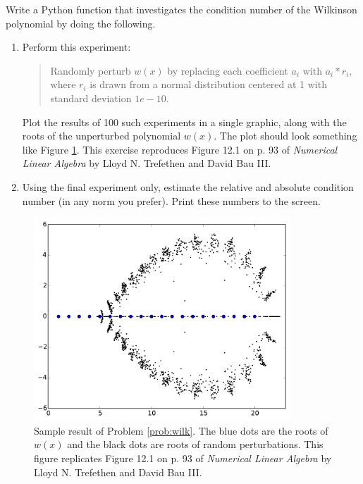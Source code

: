 \begin{problem}\label{prob:wilk}
Write a Python function that investigates the condition number of the Wilkinson polynomial by doing the following.
\begin{enumerate}
\item Perform this experiment:

\begin{quote}
Randomly perturb $w(x)$ by replacing each coefficient $a_i$ with $a_i*r_i$, where $r_i$ is drawn from a normal distribution centered at 1 with standard deviation $1e-10$.
\end{quote}

Plot the results of 100 such experiments in a single graphic, along with the roots of the unperturbed polynomial $w(x)$. The plot should look something like Figure \ref{fig:wilkinsonpolynomial_many}. This exercise reproduces Figure 12.1 on p. 93 of \emph{Numerical Linear Algebra} by Lloyd N. Trefethen and David Bau III.
\item Using the final experiment only, estimate the relative and absolute condition number (in any norm you prefer). Print these numbers to the screen.
\end{enumerate}
\begin{figure}[H]
\includegraphics[height=3in]{wilkinsonpolynomial_many.pdf}
\caption{Sample result of Problem \ref{prob:wilk}.
The blue dots are the roots of $w(x)$ and the black dots are roots of random perturbations. 
This figure replicates Figure 12.1 on p. 93 of \emph{Numerical Linear Algebra} by Lloyd N. Trefethen and David Bau III.}
\label{fig:wilkinsonpolynomial_many}
\end{figure}

\end{problem}



